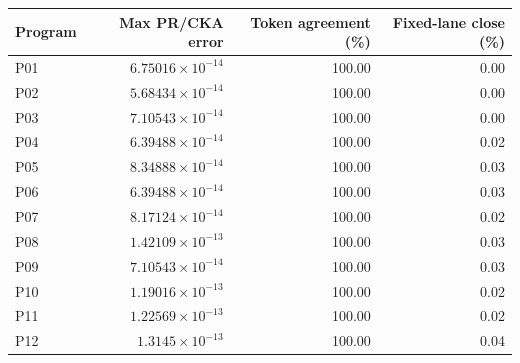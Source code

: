 \begin{center}\small
\begin{tabular}{@{}lrrr@{}}
\toprule
Program & Max PR/CKA error & Token agreement (\%) & Fixed-lane close (\%) \\
\midrule
P01 & $6.75016\times 10^{-14}$ & 100.00 & 0.00 \\
P02 & $5.68434\times 10^{-14}$ & 100.00 & 0.00 \\
P03 & $7.10543\times 10^{-14}$ & 100.00 & 0.00 \\
P04 & $6.39488\times 10^{-14}$ & 100.00 & 0.02 \\
P05 & $8.34888\times 10^{-14}$ & 100.00 & 0.03 \\
P06 & $6.39488\times 10^{-14}$ & 100.00 & 0.03 \\
P07 & $8.17124\times 10^{-14}$ & 100.00 & 0.02 \\
P08 & $1.42109\times 10^{-13}$ & 100.00 & 0.03 \\
P09 & $7.10543\times 10^{-14}$ & 100.00 & 0.03 \\
P10 & $1.19016\times 10^{-13}$ & 100.00 & 0.02 \\
P11 & $1.22569\times 10^{-13}$ & 100.00 & 0.02 \\
P12 & $1.3145\times 10^{-13}$ & 100.00 & 0.04 \\
\bottomrule
\end{tabular}
\end{center}
